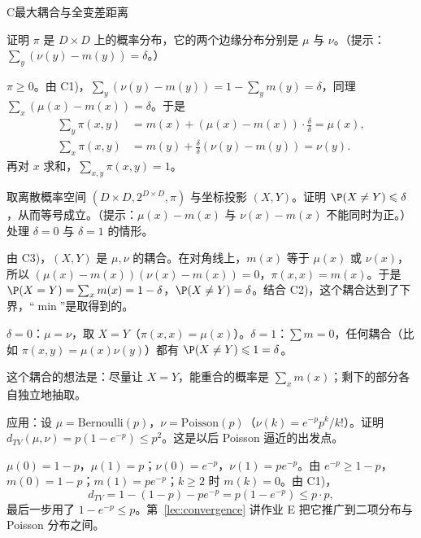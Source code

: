 \begin{probleme}{C}{最大耦合与全变差距离}
\begin{questions}
\[\]
证明 $\pi$ 是 $D\times D$ 上的概率分布，它的两个边缘分布分别是 $\mu$ 与 $\nu$。（提示：$\sum_y(\nu(y)-m(y))=\delta$。）
\begin{solution}
$\pi\geqslant0$。由 C1)，$\sum_y(\nu(y)-m(y))=1-\sum_ym(y)=\delta$，同理 $\sum_x(\mu(x)-m(x))=\delta$。于是
\[
\begin{aligned}
\sum_y\pi(x,y)&=m(x)+(\mu(x)-m(x))\cdot\frac\delta\delta=\mu(x),\\
\sum_x\pi(x,y)&=m(y)+\frac\delta\delta(\nu(y)-m(y))=\nu(y).
\end{aligned}
\]
再对 $x$ 求和，$\sum_{x,y}\pi(x,y)=1$。
\end{solution}
\item 取离散概率空间 $(D\times D,2^{D\times D},\pi)$ 与坐标投影 $(X,Y)$。证明 $\P(X\neq Y)\leqslant\delta$，从而等号成立。（提示：$\mu(x)-m(x)$ 与 $\nu(x)-m(x)$ 不能同时为正。）处理 $\delta=0$ 与 $\delta=1$ 的情形。
\begin{solution}
由 C3)，$(X,Y)$ 是 $\mu,\nu$ 的耦合。在对角线上，$m(x)$ 等于 $\mu(x)$ 或 $\nu(x)$，所以 $(\mu(x)-m(x))(\nu(x)-m(x))=0$，$\pi(x,x)=m(x)$。于是 $\P(X=Y)=\sum_xm(x)=1-\delta$，$\P(X\neq Y)=\delta$。结合 C2)，这个耦合达到了下界，“$\min$”是取得到的。

$\delta=0$：$\mu=\nu$，取 $X=Y$（$\pi(x,x)=\mu(x)$）。$\delta=1$：$\sum m=0$，任何耦合（比如 $\pi(x,y)=\mu(x)\nu(y)$）都有 $\P(X\neq Y)\leqslant1=\delta$。

这个耦合的想法是：尽量让 $X=Y$，能重合的概率是 $\sum_xm(x)$；剩下的部分各自独立地抽取。
\end{solution}
\item 应用：设 $\mu=\mathrm{Bernoulli}(p)$，$\nu=\mathrm{Poisson}(p)$（$\nu(k)=e^{-p}p^k/k!$）。证明 $d_{TV}(\mu,\nu)=p(1-e^{-p})\leqslant p^2$。这是以后 Poisson 逼近的出发点。
\begin{solution}
$\mu(0)=1-p$，$\mu(1)=p$；$\nu(0)=e^{-p}$，$\nu(1)=pe^{-p}$。由 $e^{-p}\geqslant1-p$，$m(0)=1-p$；$m(1)=pe^{-p}$；$k\geqslant2$ 时 $m(k)=0$。由 C1)，
\[
d_{TV}=1-(1-p)-pe^{-p}=p(1-e^{-p})\leqslant p\cdot p,
\]
最后一步用了 $1-e^{-p}\leqslant p$。第~\ref{lec:convergence} 讲作业 E 把它推广到二项分布与 Poisson 分布之间。
\end{solution}
\end{questions}
\end{probleme}

